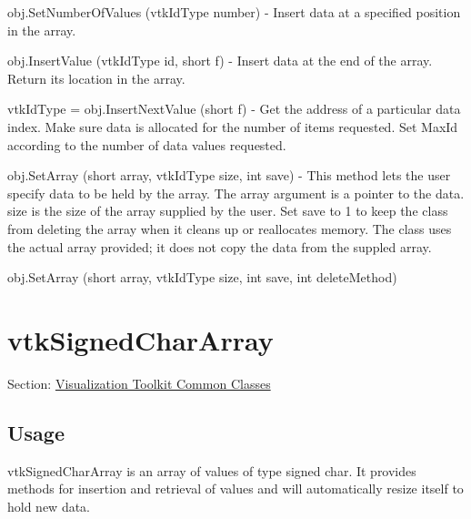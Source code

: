 \begin{DoxyItemize}
\item {\ttfamily obj.\-Set\-Number\-Of\-Values (vtk\-Id\-Type number)} -\/ Insert data at a specified position in the array.  
\item {\ttfamily obj.\-Insert\-Value (vtk\-Id\-Type id, short f)} -\/ Insert data at the end of the array. Return its location in the array.  
\item {\ttfamily vtk\-Id\-Type = obj.\-Insert\-Next\-Value (short f)} -\/ Get the address of a particular data index. Make sure data is allocated for the number of items requested. Set Max\-Id according to the number of data values requested.  
\item {\ttfamily obj.\-Set\-Array (short array, vtk\-Id\-Type size, int save)} -\/ This method lets the user specify data to be held by the array. The array argument is a pointer to the data. size is the size of the array supplied by the user. Set save to 1 to keep the class from deleting the array when it cleans up or reallocates memory. The class uses the actual array provided; it does not copy the data from the suppled array.  
\item {\ttfamily obj.\-Set\-Array (short array, vtk\-Id\-Type size, int save, int delete\-Method)}  
\end{DoxyItemize}\hypertarget{vtkcommon_vtksignedchararray}{}\section{vtk\-Signed\-Char\-Array}\label{vtkcommon_vtksignedchararray}
Section\-: \hyperlink{sec_vtkcommon}{Visualization Toolkit Common Classes} \hypertarget{vtkwidgets_vtkxyplotwidget_Usage}{}\subsection{Usage}\label{vtkwidgets_vtkxyplotwidget_Usage}
vtk\-Signed\-Char\-Array is an array of values of type signed char. It provides methods for insertion and retrieval of values and will automatically resize itself to hold new data.


